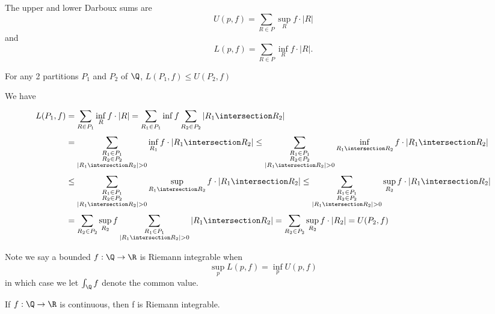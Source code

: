 \vline

\begin{definition}
	The upper and lower Darboux sums are
	\[
		U(p,f) = \sum_{R \in P} \sup_R f \cdot |R|
	\]
	and
	\[
		L(p,f) = \sum_{R \in P} \inf_R f \cdot |R|.
	\]
\end{definition}

\begin{lemma}
	For any 2 partitions $P_1$ and $P_2$ of  $\Q$,  $L(P_1,f) \leq U(P_2, f)$
\end{lemma}

\begin{solution}
	We have
	\begin{align*}
		L(P_1, f) &= \sum_{R \in P_1}^{}  \inf_{R} f \cdot |R| = \sum_{R_1 \in P_1}^{} \inf f
		\sum_{R_2 \in P_2}^{} |R_1 \intersection R_2 | \\
				  &= \sum_{\substack{R_1 \in P_1 \\ R_2 \in P_2 \\ |R_1 \intersection R_2 | > 0} }^{} \inf_{R_1} f \cdot |R_1 \intersection R_2 |
				  \leq \sum_{\substack{R_1 \in P_1 \\ R_2 \in P_2 \\ |R_1 \intersection R_2 | > 0} }^{} \inf_{R_1 \intersection R_2} f \cdot |R_1 \intersection R_2 | \\
				  &\leq \sum_{\substack{R_1 \in P_1 \\ R_2 \in P_2 \\ |R_1 \intersection R_2 | > 0} }^{} \sup_{R_1 \intersection R_2} f \cdot |R_1 \intersection R_2 |
				  \leq \sum_{\substack{R_1 \in P_1 \\ R_2 \in P_2 \\ |R_1 \intersection R_2 | > 0} }^{} \sup_{R_2} f \cdot |R_1 \intersection R_2 | \\
				  &= \sum_{R_2 \in P_2}^{} \sup_{R_2} f \sum_{\substack{R_1 \in P_1 \\ |R_1 \intersection R_2 | > 0}}^{} |R_1 \intersection R_2 |  = \sum_{R_2 \in P_2}^{} \sup_{R_2} f \cdot |R_2| = U(P_2, f)
	\end{align*}
\end{solution}


Note we say a bounded $f : \Q \to \R$ is Riemann integrable when
\[\sup_p L(p,f) = \inf_p U(p,f)\]
in which case we let  $\int_{\Q} f$ denote the common value.


\begin{theorem}
	If $f : \Q \to \R$ is continuous, then f is Riemann integrable.
\end{theorem}

